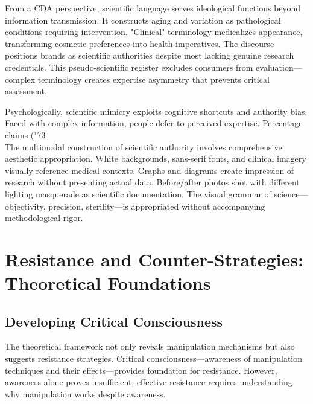 From a CDA perspective, scientific language serves ideological functions beyond information transmission. It constructs aging and variation as pathological conditions requiring intervention. "Clinical" terminology medicalizes appearance, transforming cosmetic preferences into health imperatives. The discourse positions brands as scientific authorities despite most lacking genuine research credentials. This pseudo-scientific register excludes consumers from evaluation—complex terminology creates expertise asymmetry that prevents critical assessment.

Psychologically, scientific mimicry exploits cognitive shortcuts and authority bias. Faced with complex information, people defer to perceived expertise. Percentage claims ("73\\%

The multimodal construction of scientific authority involves comprehensive aesthetic appropriation. White backgrounds, sans-serif fonts, and clinical imagery visually reference medical contexts. Graphs and diagrams create impression of research without presenting actual data. Before/after photos shot with different lighting masquerade as scientific documentation. The visual grammar of science—objectivity, precision, sterility—is appropriated without accompanying methodological rigor.

\section{Resistance and Counter-Strategies: Theoretical Foundations}
\label{sec:resistance}

\subsection{Developing Critical Consciousness}

The theoretical framework not only reveals manipulation mechanisms but also suggests resistance strategies. Critical consciousness—awareness of manipulation techniques and their effects—provides foundation for resistance. However, awareness alone proves insufficient; effective resistance requires understanding why manipulation works despite awareness.

